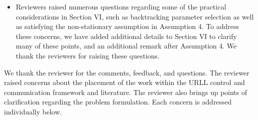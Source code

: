 \documentclass[11pt]{article}
\begin{document}
{\begin{itemize}
\item[{\bf[C3]}] Reviewers raised numerous questions regarding some of the practical considerations in Section VI, such as backtracking parameter selection as well as satisfying the non-stationary assumption in Assumption 4. To address these concerns, we have added additional details to Section VI to clarify many of these points, and an additional remark after Assumption 4. We thank the reviewers for raising these questions.


\end{itemize}}



\reviewer

We thank the reviewer for the comments, feedback, and questions. The reviewer raised concerns about the placement of the work within the URLL control and communication framework and literature. The reviewer also brings up points of clarification regarding the problem formulation. Each concern is addressed individually below.
\end{document}
